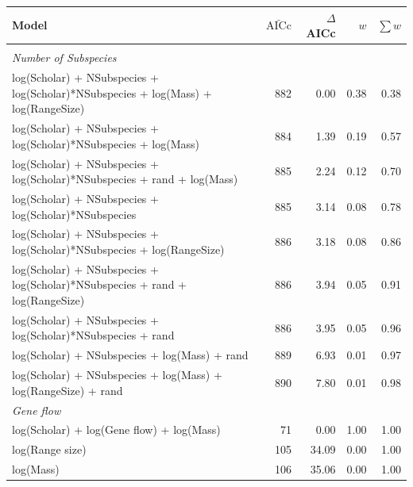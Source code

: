 {\begin{landscape}
\begin{table}[t]
\begin{tabular}{@{}>{\footnotesize}lrrrr@{}}
\toprule
\normalsize{Model} & $\bar{\text{AICc}}$ & $\Delta$AICc & $w$ & $\sum w$\\
\midrule
&&&&\\[-3mm]
\textit{\small{Number of Subspecies}} &&&&\\
log(Scholar) + NSubspecies + log(Scholar)*NSubspecies  + log(Mass) + log(RangeSize) & 
882 & 0.00 &
0.38 & 0.38\\
log(Scholar) + NSubspecies + log(Scholar)*NSubspecies  + log(Mass) & 
884 & 1.39 &
0.19 & 0.57\\
log(Scholar) + NSubspecies + log(Scholar)*NSubspecies + rand + log(Mass) & 
885 & 2.24 &
0.12 & 0.70\\
log(Scholar) + NSubspecies + log(Scholar)*NSubspecies  & 
885 & 3.14 &
0.08 & 0.78\\
log(Scholar) + NSubspecies + log(Scholar)*NSubspecies  + log(RangeSize) & 
886 & 3.18 &
0.08 & 0.86\\
log(Scholar) + NSubspecies + log(Scholar)*NSubspecies  + rand + log(RangeSize) & 
886 & 3.94 &
0.05 & 0.91\\
log(Scholar) + NSubspecies + log(Scholar)*NSubspecies  + rand & 
886 & 3.95 &
0.05 & 0.96\\
log(Scholar) + NSubspecies + log(Mass) + rand & 
889 & 6.93 &
0.01 & 0.97\\
log(Scholar) + NSubspecies + log(Mass) + log(RangeSize) + rand& 
890 & 7.80 &
0.01 & 0.98\\[5mm]
\textit{\small{Gene flow}} &&&&\\
log(Scholar) + log(Gene flow) + log(Mass) & 
71 & 0.00 &
1.00 & 1.00\\
log(Range size) & 
105 & 34.09 &
0.00 & 1.00\\
log(Mass) & 
106 & 35.06 &
0.00 & 1.00\\
\bottomrule
\end{tabular}

\label{t:models}
\end{table}
\end{landscape}
}





